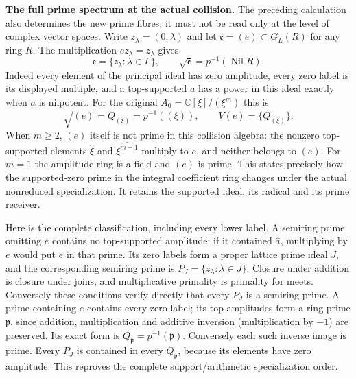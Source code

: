 \HC\textbf{The full prime spectrum at the actual collision.}
The preceding calculation also determines the new prime fibres;
it must not be read only at the level of complex vector spaces.
Write $z_\lambda=(0,\lambda)$ and let
$\mathfrak e=(e)\subset G_L(R)$ for any ring $R$.
The multiplication $ez_\lambda=z_\lambda$ gives
\[
 \mathfrak e=\{z_\lambda:\lambda\in L\},\qquad
 \sqrt{\mathfrak e}=p^{-1}(\operatorname{Nil}R).
 \tag{HC27}
\]
Indeed every element of the principal ideal has zero amplitude,
every zero label is its displayed multiple, and a top-supported
$a$ has a power in this ideal exactly when $a$ is nilpotent.
For the original $A_0=\mathbb C[\xi]/(\xi^m)$ this is
\[
 \sqrt{(e)}=Q_{(\xi)}=p^{-1}((\xi)),
 \qquad V(e)=\{Q_{(\xi)}\}.
 \tag{HC28}
\]
When $m\ge2$, $(e)$ itself is not prime in this collision algebra:
the nonzero top-supported elements $\widehat\xi$ and
$\widehat{\xi^{m-1}}$ multiply to $e$, and neither belongs to $(e)$.
For $m=1$ the amplitude ring is a field and $(e)$ is prime.
This states precisely how the supported-zero prime in the integral
coefficient ring changes under the actual nonreduced specialization.
It retains the supported ideal, its radical and its prime receiver.

Here is the complete classification, including every lower label.
A semiring prime omitting $e$ contains no top-supported amplitude:
if it contained $\widehat a$, multiplying by $e$ would put $e$
in that prime. Its zero labels form a proper lattice prime ideal
$J$, and the corresponding semiring prime is
$P_J=\{z_\lambda:\lambda\in J\}$. Closure under addition is closure
under joins, and multiplicative primality is primality for meets.
Conversely these conditions verify directly that every $P_J$ is a
semiring prime. A prime containing $e$ contains every zero label;
its top amplitudes form a ring prime $\mathfrak p$, since addition,
multiplication and additive inversion (multiplication by $-1$)
are preserved. Its exact form is $Q_{\mathfrak p}=p^{-1}(\mathfrak p)$.
Conversely each such inverse image is prime. Every $P_J$ is contained
in every $Q_{\mathfrak p}$, because its elements have zero amplitude.
This reproves the complete support/arithmetic specialization order.

